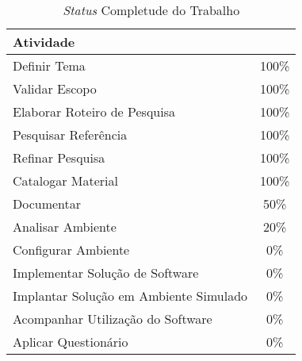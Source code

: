 \begin{table}[h]
\centering
\caption{\textit{Status} Completude do Trabalho}
\label{table_status}
\begin{tabular}{lc}
\rowcolor[HTML]{9A0000} 
{\color[HTML]{FFFFFF} \textbf{Atividade}} & \multicolumn{1}{l}{\cellcolor[HTML]{9A0000}{\color[HTML]{FFFFFF} \textbf{Status}}} \\ \hline
Definir Tema                              & 100\%                                                                              \\ \hline
Validar Escopo                            & 100\%                                                                              \\ \hline
Elaborar Roteiro de Pesquisa              & 100\%                                                                              \\ \hline
Pesquisar Referência                      & 100\%                                                                              \\ \hline
Refinar Pesquisa                          & 100\%                                                                              \\ \hline
Catalogar Material                        & 100\%                                                                              \\ \hline
Documentar                                & 50\%                                                                               \\ \hline
Analisar Ambiente                         & 20\%                                                                               \\ \hline
Configurar Ambiente                       & 0\%                                                                                \\ \hline
Implementar Solução de Software           & 0\%                                                                                \\ \hline
Implantar Solução em Ambiente Simulado    & 0\%                                                                                \\ \hline
Acompanhar Utilização do Software         & 0\%                                                                                \\ \hline
Aplicar Questionário                      & 0\%                                                                                \\ \hline
\end{tabular}
\end{table}


